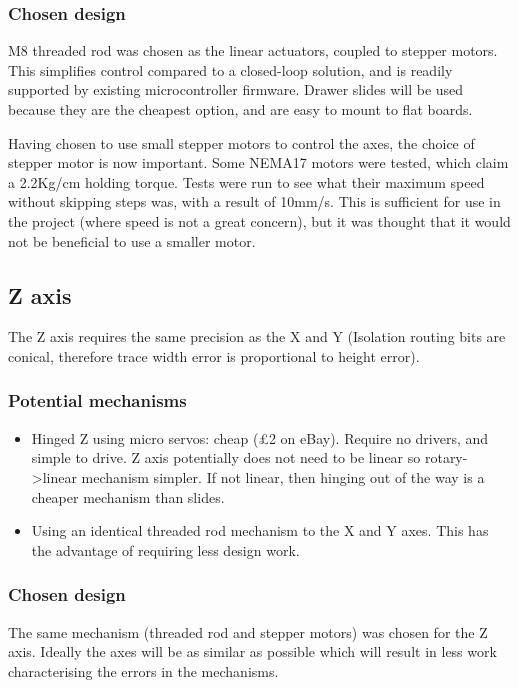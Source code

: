 \subsubsection{Chosen design}

M8 threaded rod was chosen as the linear actuators, coupled to stepper motors. This simplifies control compared to a closed-loop solution, and is readily
supported by existing microcontroller firmware. Drawer slides will be used because they are the cheapest option, and are easy to mount to flat boards.

Having chosen to use small stepper motors to control the axes, the choice of stepper motor is now important. Some NEMA17 motors were tested,
 which claim a 2.2Kg/cm holding torque. Tests were run to see what their maximum
speed without skipping steps was, with a result of 10mm/s. This is sufficient for use in the
project (where speed is not a great concern), but it was thought that it would not be beneficial to use a smaller motor. 

\subsection{Z axis}
The Z axis requires the same precision as the X and Y (Isolation routing bits are conical, therefore trace width error is proportional to height error). 

\subsubsection{Potential mechanisms}

\begin{itemize}
	\item	Hinged Z using micro servos: cheap (\pounds 2 on eBay). Require no drivers, and simple to drive. Z axis potentially
		does not need to be linear so rotary-\textgreater linear mechanism simpler. If not linear,
		then hinging out of the way is a cheaper mechanism than slides.
	\item	Using an identical threaded rod mechanism to the X and Y axes. This has the advantage of requiring less design work.
\end{itemize}

\subsubsection{Chosen design}
The same mechanism (threaded rod and stepper motors) was chosen for the Z axis. Ideally the axes will be as similar as possible which will result
in less work characterising the errors in the mechanisms.

